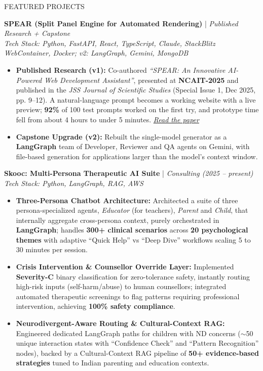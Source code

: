 \documentclass{resume} %
\begin{document}
\begin{rSection}{FEATURED PROJECTS}
\item \textbf{SPEAR (Split Panel Engine for Automated Rendering)} | \textit{Published Research + Capstone} \\
\textit{Tech Stack: Python, FastAPI, React, TypeScript, Claude, StackBlitz WebContainer, Docker; v2: LangGraph, Gemini, MongoDB}
\begin{itemize}
    \item \textbf{Published Research (v1):} Co-authored \textit{``SPEAR: An Innovative AI-Powered Web Development Assistant''}, presented at \textbf{NCAIT-2025} and published in the \textit{JSS Journal of Scientific Studies} (Special Issue 1, Dec 2025, pp. 9--12). A natural-language prompt becomes a working website with a live preview; \textbf{92\%} of 100 test prompts worked on the first try, and prototype time fell from about 4 hours to under 5 minutes. \href{https://jssateb-journal.vercel.app/journal/vol2-issue-2/paper_17.pdf}{\textit{Read the paper}}
    \item \textbf{Capstone Upgrade (v2):} Rebuilt the single-model generator as a \textbf{LangGraph} team of Developer, Reviewer and QA agents on Gemini, with file-based generation for applications larger than the model's context window.
\end{itemize}

\vspace{0.5em}

\item \textbf{Skooc: Multi-Persona Therapeutic AI Suite} | \textit{Consulting (2025 -- present)} \\
\textit{Tech Stack: Python, LangGraph, RAG, AWS}
\begin{itemize}
    \item \textbf{Three-Persona Chatbot Architecture:} Architected a suite of three persona-specialized agents, \textit{Educator} (for teachers), \textit{Parent} and \textit{Child}, that internally aggregate cross-persona context, purely orchestrated in \textbf{LangGraph}; handles \textbf{300+ clinical scenarios} across \textbf{20 psychological themes} with adaptive ``Quick Help'' vs ``Deep Dive'' workflows scaling 5 to 30 minutes per session.
    \item \textbf{Crisis Intervention \& Counsellor Override Layer:} Implemented \textbf{Severity-C} binary classification for zero-tolerance safety, instantly routing high-risk inputs (self-harm/abuse) to human counsellors; integrated automated therapeutic screenings to flag patterns requiring professional intervention, achieving \textbf{100\% safety compliance}.
    \item \textbf{Neurodivergent-Aware Routing \& Cultural-Context RAG:} Engineered dedicated LangGraph paths for children with ND concerns ($\sim$50 unique interaction states with ``Confidence Check'' and ``Pattern Recognition'' nodes), backed by a Cultural-Context RAG pipeline of \textbf{50+ evidence-based strategies} tuned to Indian parenting and education contexts.
\end{itemize}

\end{rSection}
\end{document}
